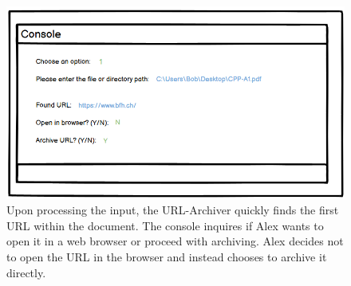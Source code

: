\begin{figure}[h!]
    \centering
    \includegraphics[width=1\textwidth]{pictures/Story Board/StoryBoard_3}
    \caption{Upon processing the input, the URL-Archiver quickly finds the first URL within the document. The console inquires if Alex wants to open it in a web browser or proceed with archiving. Alex decides not to open the URL in the browser and instead chooses to archive it directly.}
    \label{fig:StoryBoard_3}
\end{figure}
\clearpage

